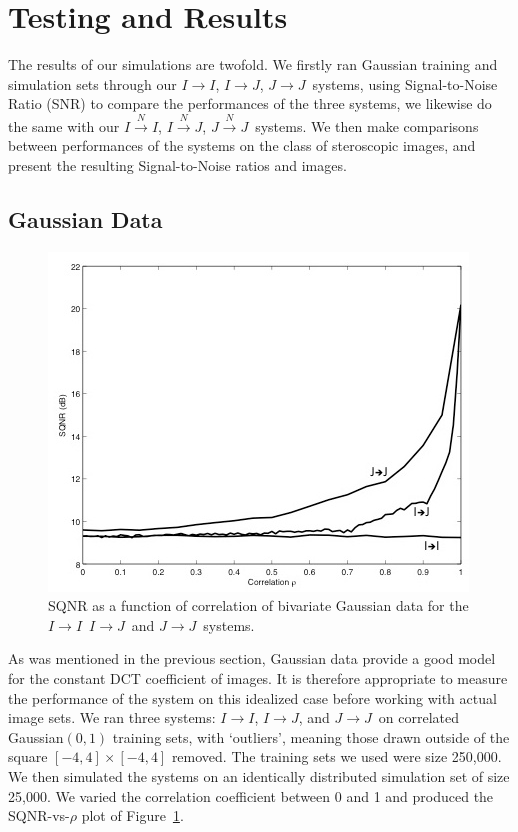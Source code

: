 \documentclass[10pt,twoside,titlepage]{article}
\newcommand{\sysIIN}{\mbox{$I \overset{N}{\rightarrow} I$}}
\newcommand{\sysII}{\mbox{$I \rightarrow I$}}
\newcommand{\sysIJN}{\mbox{$I \overset{N}{\rightarrow} J$}}
\newcommand{\sysIJ}{\mbox{$I \rightarrow J$}}
\newcommand{\sysJJN}{\mbox{$J \overset{N}{\rightarrow} J$}}
\newcommand{\sysJJ}{\mbox{$J \rightarrow J$}}
\begin{document}
\section{Testing and Results}
The results of our simulations are twofold. We firstly ran Gaussian training and simulation sets through our \sysII, \sysIJ, \sysJJ\ systems, using Signal-to-Noise Ratio (SNR) to compare the performances of the three systems, we likewise do the same with our \sysIIN, \sysIJN, \sysJJN\ systems. We then make comparisons between performances of the systems on the class of steroscopic images, and present the resulting Signal-to-Noise ratios and images.
\subsection{Gaussian Data}

\begin{figure}[h]
    \centering
    \includegraphics[width=0.65\linewidth]{img/dist_v_rho.png}
    \caption{SQNR as a function of correlation of bivariate Gaussian data for the \sysII\ \sysIJ\ and \sysJJ\ systems.}
    \label{fig:SQNR}
\end{figure}

As was mentioned in the previous section, Gaussian data provide a good model for the constant DCT coefficient of images. It is therefore appropriate to measure the performance of the system on this idealized case before working with actual image sets. We ran three systems: \sysII, \sysIJ, and \sysJJ\ on correlated Gaussian$(0,1)$ training sets, with `outliers', meaning those drawn outside of the square $[-4,4]\times[-4,4]$ removed. The training sets we used were size 250,000. We then simulated the systems on an identically distributed simulation set of size 25,000. We varied the correlation coefficient between 0 and 1 and produced the SQNR-vs-$\rho$ plot of Figure~\ref{fig:SQNR}.
\end{document}
